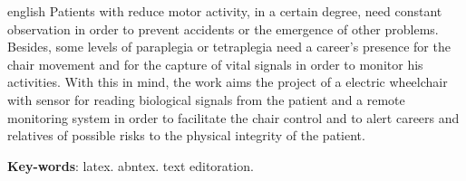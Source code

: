 \begin{resumo}[Abstract]
 \begin{otherlanguage*}{english}
   Patients with reduce motor activity, in a certain degree, need constant observation in order to prevent accidents or the emergence of other problems. Besides, some levels of paraplegia or tetraplegia need a career's presence for the chair movement and for the capture of vital signals in order to monitor his activities. With this in mind, the work aims the project of a electric wheelchair with sensor for reading biological signals from the patient and a remote monitoring system in order to facilitate the chair control and to alert careers and relatives of possible risks to the physical integrity of the patient. 

   \vspace{\onelineskip}
 
   \noindent 
   \textbf{Key-words}: latex. abntex. text editoration.
 \end{otherlanguage*}
\end{resumo}
